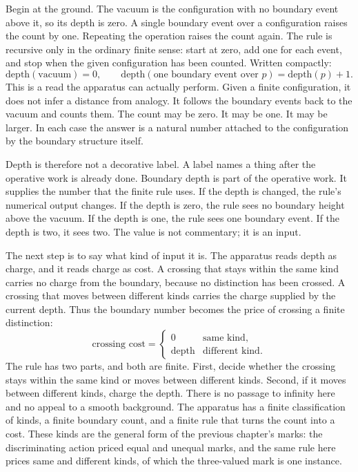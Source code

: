 Begin at the ground. The vacuum is the configuration with no boundary event above it,
so its depth is zero. A single boundary event over a configuration raises the count by
one. Repeating the operation raises the count again. The rule is recursive only in the
ordinary finite sense: start at zero, add one for each event, and stop when the given
configuration has been counted. Written compactly:
\[
  \mathrm{depth}(\text{vacuum}) = 0,
  \qquad
  \mathrm{depth}(\text{one boundary event over } p) = \mathrm{depth}(p) + 1.
\]
This is a read the apparatus can actually perform. Given a finite configuration, it
does not infer a distance from analogy. It follows the boundary events back to the
vacuum and counts them. The count may be zero. It may be one. It may be larger. In
each case the answer is a natural number attached to the configuration by the boundary
structure itself.

Depth is therefore not a decorative label. A label names a thing after the operative
work is already done. Boundary depth is part of the operative work. It supplies the
number that the finite rule uses. If the depth is changed, the rule's numerical output
changes. If the depth is zero, the rule sees no boundary height above the vacuum. If
the depth is one, the rule sees one boundary event. If the depth is two, it sees two.
The value is not commentary; it is an input.

The next step is to say what kind of input it is. The apparatus reads depth as charge,
and it reads charge as cost. A crossing that stays within the same kind carries no
charge from the boundary, because no distinction has been crossed. A crossing that
moves between different kinds carries the charge supplied by the current depth. Thus
the boundary number becomes the price of crossing a finite distinction:
\[
  \text{crossing cost} =
  \begin{cases}
    0 & \text{same kind},\\
    \mathrm{depth} & \text{different kind}.
  \end{cases}
\]
The rule has two parts, and both are finite. First, decide whether the crossing stays
within the same kind or moves between different kinds. Second, if it moves between
different kinds, charge the depth. There is no passage to infinity here and no appeal
to a smooth background. The apparatus has a finite classification of kinds, a finite
boundary count, and a finite rule that turns the count into a cost. These kinds are
the general form of the previous chapter's marks: the discriminating action priced
equal and unequal marks, and the same rule here prices same and different kinds, of
which the three-valued mark is one instance.

